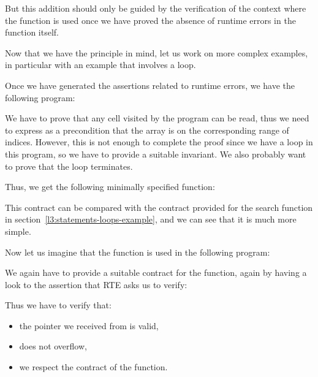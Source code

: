 

But this addition should only be guided by the verification of the context where
the function is used once we have proved the absence of runtime errors in the
function itself.





Now that we have the principle in mind, let us work on more complex examples, in
particular with an example that involves a loop.




Once we have generated the assertions related to runtime errors, we have the
following program:




We have to prove that any cell visited by the program can be read, thus we need
to express as a precondition that the array is
 on the corresponding range of indices.
However, this is not enough to complete the proof since we have a loop in this
program, so we have to provide a suitable invariant. We also probably want to
prove that the loop terminates.


Thus, we get the following minimally specified function:




This contract can be compared with the contract provided for the search
function in section~\ref{l3:statements-loops-example}, and we can see that it is
much more simple.


Now let us imagine that the function is used in the following program:




We again have to provide a suitable contract for the function, again by having
a look to the assertion that RTE asks us to verify:




Thus we have to verify that:


\begin{itemize}
\item the pointer we received from  is valid,
\item {} does not overflow,
\item we respect the contract of the  function.
\end{itemize}


